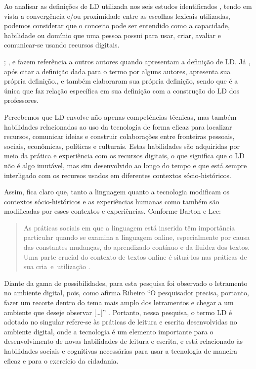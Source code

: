 Ao analisar as definições de LD utilizada nos seis estudos identificados
\cite{oliveira2018multiletramentos,campbell2020developing,almusharraf2020postsecondary,krajka2021,dhillon2021investigation,roche2017assessing}, tendo
em vista a convergência e/ou proximidade entre as escolhas lexicais
utilizadas, podemos considerar que o conceito pode ser entendido como a
capacidade, habilidade ou domínio que uma pessoa possui para usar,
criar, avaliar e comunicar-se usando recursos digitais.

\textcite{campbell2020developing}; \textcite{dhillon2021investigation}, e \textcite{oliveira2018multiletramentos} fazem referência a outros autores quando apresentam a definição
de LD. Já \textcite{roche2017assessing}, após citar a definição dada para o termo por
alguns autores, apresenta sua própria definição.\textcite{almusharraf2020postsecondary}, e \textcite{krajka2021} também elaboraram sua própria definição, sendo
que \textcite{krajka2021} é a única que faz relação específica em sua definição
com a construção do LD dos professores.

Percebemos que LD envolve não apenas competências técnicas, mas também
habilidades relacionadas ao uso da tecnologia de forma eficaz para
localizar recursos, comunicar ideias e construir colaborações entre
fronteiras pessoais, sociais, econômicas, políticas e culturais. Estas
habilidades são adquiridas por meio da prática e experiência com os
recursos digitais, o que significa que o LD não é algo imutável, mas sim
desenvolvido ao longo do tempo e que está sempre interligado com os
recursos usados em diferentes contextos sócio-históricos.

Assim, fica claro que, tanto a linguagem quanto a tecnologia modificam
os contextos sócio-históricos e as experiências humanas como também são
modificadas por esses contextos e experiências. Conforme Barton e Lee:

\begin{quote}
As práticas sociais em que a linguagem está inserida têm importância
particular quando se examina a linguagem online, especialmente por causa
das constantes mudanças, do aprendizado contínuo e da fluidez dos
textos. Uma parte crucial do contexto de textos online é situá-los nas
práticas de sua cria~e~utilização \cite[p. 24]{barton2015linguagem}.
\end{quote}

Diante da gama de possibilidades, para esta pesquisa foi observado o
letramento no ambiente digital, pois, como afirma Ribeiro ``O
pesquisador precisa, portanto, fazer um recorte dentro do tema mais
amplo dos letramentos e chegar a um ambiente que deseje observar
{[}\ldots{]}'' \cite[p. 26]{ribeiro2017}. Portanto, nessa pesquisa, o termo LD
é adotado no singular refere-se às práticas de leitura e escrita
desenvolvidas no ambiente digital, onde a tecnologia é um elemento
importante para o desenvolvimento de novas habilidades de leitura e
escrita, e está relacionado às habilidades sociais e cognitivas
necessárias para usar a tecnologia de maneira eficaz e para o exercício
da cidadania.

